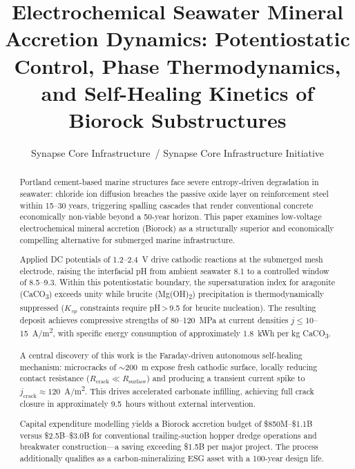 \documentclass[journal,twocolumn]{IEEEtran}
\begin{document}
\title{Electrochemical Seawater Mineral Accretion Dynamics: Potentiostatic Control, Phase Thermodynamics, and Self-Healing Kinetics of Biorock Substructures}

\author{Synapse Core Infrastructure~/ Synapse Core Infrastructure Initiative}

\maketitle

\begin{abstract}
Portland cement-based marine structures face severe entropy-driven degradation in seawater: chloride ion diffusion breaches the passive oxide layer on reinforcement steel within 15--30 years, triggering spalling cascades that render conventional concrete economically non-viable beyond a 50-year horizon. This paper examines low-voltage electrochemical mineral accretion (Biorock) as a structurally superior and economically compelling alternative for submerged marine infrastructure.

Applied DC potentials of 1.2--2.4~V drive cathodic reactions at the submerged mesh electrode, raising the interfacial pH from ambient seawater 8.1 to a controlled window of 8.5--9.3. Within this potentiostatic boundary, the supersaturation index for aragonite (CaCO\textsubscript{3}) exceeds unity while brucite (Mg(OH)\textsubscript{2}) precipitation is thermodynamically suppressed ($K_{sp}$ constraints require pH\,>\,9.5 for brucite nucleation). The resulting deposit achieves compressive strengths of 80--120~MPa at current densities $j \leq 10$--15~A/m\textsuperscript{2}, with specific energy consumption of approximately 1.8~kWh per kg CaCO\textsubscript{3}.

A central discovery of this work is the Faraday-driven autonomous self-healing mechanism: microcracks of $\sim$200~\textmu m expose fresh cathodic surface, locally reducing contact resistance ($R_{\mathrm{crack}} \ll R_{\mathrm{surface}}$) and producing a transient current spike to $j_{\mathrm{crack}} \approx 120$~A/m\textsuperscript{2}. This drives accelerated carbonate infilling, achieving full crack closure in approximately 9.5~hours without external intervention.

Capital expenditure modelling yields a Biorock accretion budget of \$850M--\$1.1B versus \$2.5B--\$3.0B for conventional trailing-suction hopper dredge operations and breakwater construction---a saving exceeding \$1.5B per major project. The process additionally qualifies as a carbon-mineralizing ESG asset with a 100-year design life.
\end{abstract}
\end{document}
